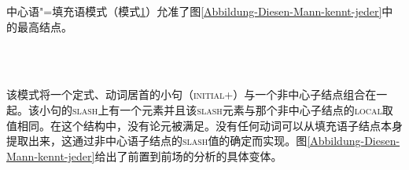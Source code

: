 \noindent
中心语"=填充语模式（模式\ref{hf-schemaa}）允准了图\vref{Abbildung-Diesen-Mann-kennt-jeder}中的最高结点。
%
\begin{figure}
\begin{schema}[中心语"=填充语模式]
\label{hf-schemaa}
~\\\samepage
{} \impl\\
\end{schema}
\vspace{-\baselineskip}
\end{figure}%
该模式将一个定式、动词居首的小句（\textsc{initial}+）与一个非中心子结点组合在一起。该小句的\textsc{slash}上有一个元素并且该\textsc{slash}元素与那个非中心子结点的\textsc{local}取值相同。在这个结构中，没有论元被满足。没有任何动词可以从填充语子结点本身提取出来，这通过非中心语子结点的\textsc{slash}值的确定而实现。图\ref{Abbildung-Diesen-Mann-kennt-jeder}给出了前置到前场的分析的具体变体。
